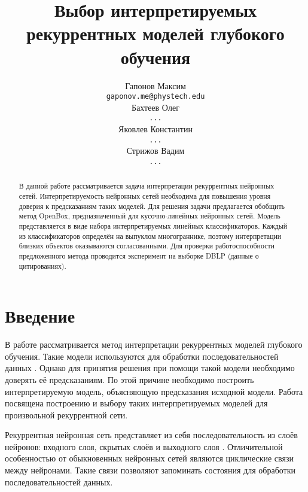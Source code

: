 \documentclass[12pt]{article}
\begin{document}
\title
{Выбор интерпретируемых рекуррентных моделей глубокого обучения}
\author{Гапонов Максим \\
	\texttt{gaponov.me@phystech.edu} \\
	\And
	Бахтеев Олег \\
	\texttt{...} \\
	\And
	Яковлев Константин \\
	\texttt{...} \\
	\And
	Стрижов Вадим \\
	\texttt{...} \\
}
\date{}
\maketitle
\begin{abstract}
В данной работе рассматривается задача интерпретации рекуррентных нейронных сетей. Интерпретируемость нейронных сетей необходима для повышения уровня доверия к предсказаниям таких моделей. Для решения задачи предлагается обобщить метод OpenBox, предназначенный для кусочно-линейных нейронных сетей. Модель представляется в виде набора интерпретируемых линейных классификаторов. Каждый из классификаторов определён на выпуклом многограннике, поэтому интерпретации близких объектов оказываются согласованными. Для проверки работоспособности предложенного метода проводится эксперимент на выборке DBLP (данные о цитированиях).
\end{abstract}

\section{Введение}
В работе рассматривается метод интерпретации рекуррентных моделей глубокого обучения. Такие модели используются для обработки последовательностей данных \cite{lipton2015critical}. Однако для принятия решения при помощи такой модели необходимо доверять её предсказаниям. По этой причине необходимо построить интерпретируемую модель, объясняющую предсказания исходной модели. Работа посвящена построению и выбору таких интерпретируемых моделей для произвольной рекуррентной сети.

Рекуррентная нейронная сеть представляет из себя последовательность из слоёв нейронов: входного слоя, скрытых слоёв и выходного слоя \cite{sherstinsky2020fundrnn}. Отличительной особенностью от обыкновенных нейронных сетей являются циклические связи между нейронами. Такие связи позволяют запоминать состояния для обработки последовательностей данных.
\end{document}
